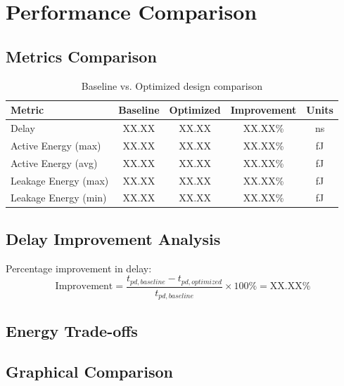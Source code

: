\documentclass[12pt,letterpaper]{article}
\begin{document}
\section{Performance Comparison}
\label{sec:comparison}


\subsection{Metrics Comparison}

\begin{table}[H]
\centering
\caption{Baseline vs. Optimized design comparison}
\label{tab:comparison}
\begin{tabular}{@{}lcccc@{}}
\toprule
\textbf{Metric} & \textbf{Baseline} & \textbf{Optimized} & \textbf{Improvement} & \textbf{Units} \\
\midrule
Delay & XX.XX & XX.XX & XX.XX\% & ns \\
Active Energy (max) & XX.XX & XX.XX & XX.XX\% & fJ \\
Active Energy (avg) & XX.XX & XX.XX & XX.XX\% & fJ \\
Leakage Energy (max) & XX.XX & XX.XX & XX.XX\% & fJ \\
Leakage Energy (min) & XX.XX & XX.XX & XX.XX\% & fJ \\
\bottomrule
\end{tabular}
\end{table}

\subsection{Delay Improvement Analysis}

Percentage improvement in delay:
\begin{equation}
\text{Improvement} = \frac{t_{pd,baseline} - t_{pd,optimized}}{t_{pd,baseline}} \times 100\% = \text{XX.XX\%}
\end{equation}

\subsection{Energy Trade-offs}


\subsection{Graphical Comparison}
\end{document}
